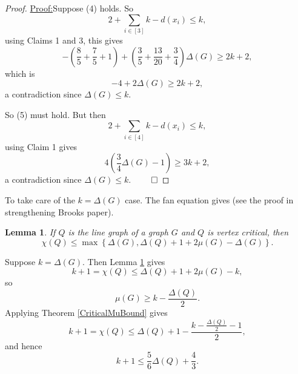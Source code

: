 \documentclass[12pt]{amsart}
\theoremstyle{plain}
\newtheorem{lem}[thm]{Lemma}
\theoremstyle{definition}
\theoremstyle{remark}
\newcommand{\irange}[1]{\left[#1\right]}
\newcommand{\parens}[1]{\left( #1 \right)}
\newenvironment{claimproof}[1]{\par\noindent\underline{Proof:}\space#1}{\leavevmode\unskip\penalty9999
\hbox{}\nobreak\hfill\quad\hbox{$\qed$}}
\begin{document}
\begin{proof}
\begin{claimproof}
Suppose (4) holds.  So
\[2 + \sum_{i \in \irange{3}} k - d(x_i) \le k,\]
using Claims 1 and 3, this gives
\[-\parens{\frac85 + \frac75 + 1} + \parens{\frac35 + \frac{13}{20} + \frac34}\Delta(G)\ge 2k+2,\]
which is
\[-4 + 2\Delta(G) \ge 2k+2,\]
a contradiction since $\Delta(G) \le k$.


So (5) must hold.  But then
\[2 + \sum_{i \in \irange{4}} k - d(x_i) \le k,\]
using Claim 1 gives
\[4\parens{\frac34\Delta(G) - 1} \ge 3k+2,\]
a contradiction since $\Delta(G) \le k$.
\end{claimproof}

\end{proof}


To take care of the $k = \Delta(G)$ case. The fan equation gives (see the proof in strengthening Brooks paper).
\begin{lem}\label{CriticalMuBoundOtherWay}
If $Q$ is the line graph of a graph $G$ and $Q$ is vertex critical, then
\[\chi(Q) \leq \max\left\{\Delta(G), \Delta(Q) + 1 + 2\mu(G) - \Delta(G)\right\}.\]
\end{lem}

Suppose $k = \Delta(G)$.  Then Lemma \ref{CriticalMuBoundOtherWay} gives
\[k + 1 = \chi(Q) \le \Delta(Q) + 1 + 2\mu(G) - k,\]
so
\[\mu(G) \ge k - \frac{\Delta(Q)}{2}.\]
Applying Theorem \ref{CriticalMuBound} gives
\[k+1 = \chi(Q) \le \Delta(Q) + 1 - \frac{k - \frac{\Delta(Q)}{2} - 1}{2},\]
and hence
\[k+1 \le \frac56\Delta(Q) + \frac43.\]

\newpage
\end{document}
